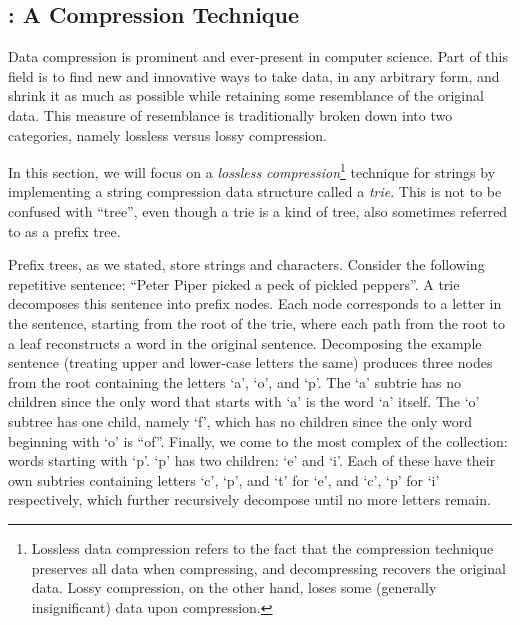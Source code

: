 
\subsection*{: A Compression Technique}

Data compression is prominent and ever-present in computer science. Part of this field is to find new and innovative ways to take data, in any arbitrary form, and shrink it as much as possible while retaining some resemblance of the original data. This measure of resemblance is traditionally broken down into two categories, namely lossless versus lossy compression.

In this section, we will focus on a \textit{lossless compression}\footnote{Lossless data compression refers to the fact that the compression technique preserves all data when compressing, and decompressing recovers the original data. Lossy compression, on the other hand, loses some (generally insignificant) data upon compression.} technique for strings by implementing a string compression data structure called a \textit{trie}. This is not to be confused with ``tree'', even though a trie is a kind of tree, also sometimes referred to as a prefix tree. 

Prefix trees, as we stated, store strings and characters. Consider the following repetitive sentence: ``Peter Piper picked a peck of pickled peppers''. A trie decomposes this sentence into prefix nodes. Each node corresponds to a letter in the sentence, starting from the root of the trie, where each path from the root to a leaf reconstructs a word in the original sentence. Decomposing the example sentence (treating upper and lower-case letters the same) produces three nodes from the root containing the letters `a', `o', and `p'. The `a' subtrie has no children since the only word that starts with `a' is the word `a' itself. The `o' subtree has one child, namely `f', which has no children since the only word beginning with `o' is ``of''. Finally, we come to the most complex of the collection: words starting with `p'. `p' has two children: `e' and `i'. Each of these have their own subtries containing letters `c', `p', and `t' for `e', and `c', `p' for `i' respectively, which further recursively decompose until no more letters remain.

